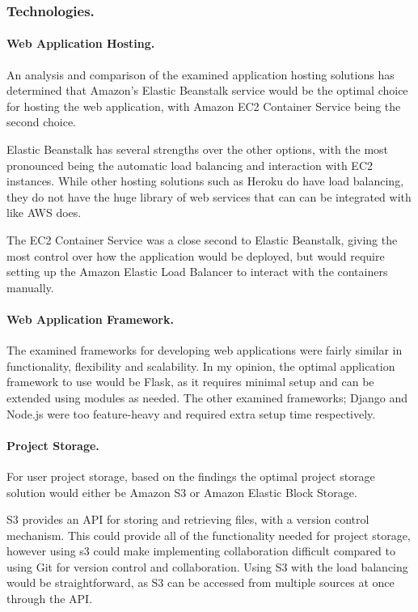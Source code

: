\documentclass[a4paper, 12pt]{article}
\begin{document}
\subsubsection{Technologies.}
\paragraph{Web Application Hosting.}
An analysis and comparison of the examined application hosting solutions has determined that Amazon's Elastic Beanstalk service would be the optimal choice for hosting the web application, with Amazon EC2 Container Service being the second choice.

Elastic Beanstalk has several strengths over the other options, with the most pronounced being the automatic load balancing and interaction with EC2 instances. While other hosting solutions such as Heroku do have load balancing, they do not have the huge library of web services that can can be integrated with like AWS does.

The EC2 Container Service was a close second to Elastic Beanstalk, giving the most control over how the application would be deployed, but would require setting up the Amazon Elastic Load Balancer to interact with the containers manually.

\paragraph{Web Application Framework.}
The examined frameworks for developing web applications were fairly similar in functionality, flexibility and scalability. In my opinion, the optimal application framework to use would be Flask, as it requires minimal setup and can be extended using modules as needed. The other examined frameworks; Django and Node.js were too feature-heavy and required extra setup time respectively.

\paragraph{Project Storage.}
For user project storage, based on the findings the optimal project storage solution would either be Amazon S3 or Amazon Elastic Block Storage.

S3 provides an API for storing and retrieving files, with a version control mechanism. This could provide all of the functionality needed for project storage, however using s3 could make implementing collaboration difficult compared to using Git for version control and collaboration. Using S3 with the load balancing would be straightforward, as S3 can be accessed from multiple sources at once through the API.
\end{document}
